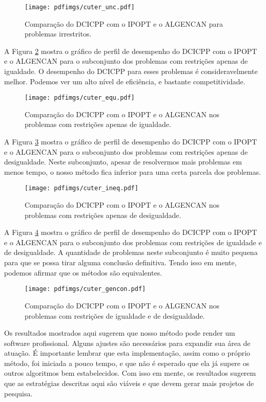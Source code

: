 \begin{figure}[!ht]
\centering
\texttt{[image: pdfimgs/cuter\_unc.pdf]}
\caption{ Comparação do DCICPP com o IPOPT e o ALGENCAN para problemas
irrestritos.}
\label{fig:union_unc_strict}
\end{figure}

A Figura \ref{fig:union_equ_strict} mostra o gráfico de perfil de
desempenho do DCICPP com o IPOPT e o ALGENCAN para o subconjunto dos problemas
com restrições apenas de igualdade. O desempenho do DCICPP para esses problemas é
consideravelmente melhor. Podemos ver um alto nível de eficiência, e bastante
competitividade.

\begin{figure}[!ht]
\centering
\texttt{[image: pdfimgs/cuter\_equ.pdf]}
\caption{ Comparação do DCICPP com o IPOPT e o ALGENCAN nos problemas com
restrições apenas de igualdade.}
\label{fig:union_equ_strict}
\end{figure}

A Figura \ref{fig:union_ineq_strict} mostra o gráfico de perfil de
desempenho do DCICPP com o IPOPT e o ALGENCAN para o subconjunto dos problemas
com restrições apenas de desigualdade. Neste subconjunto, apesar de resolvermos
mais problemas em menos tempo, o nosso método fica inferior para uma certa
parcela dos problemas. 

\begin{figure}[!ht]
\centering
\texttt{[image: pdfimgs/cuter\_ineq.pdf]}
\caption{ Comparação do DCICPP com o IPOPT e o ALGENCAN nos problemas com
restrições apenas de desigualdade.}
\label{fig:union_ineq_strict}
\end{figure}

A Figura \ref{fig:union_gencon_strict} mostra o gráfico de perfil de
desempenho do DCICPP com o IPOPT e o ALGENCAN para o subconjunto dos problemas
com restrições de igualdade e de desigualdade. A quantidade de problemas neste
subconjunto é muito pequena para que se possa tirar alguma conclusão definitiva.
Tendo isso em mente, podemos afirmar que os métodos são equivalentes.

\begin{figure}[!ht]
\centering
\texttt{[image: pdfimgs/cuter\_gencon.pdf]}
\caption{ Comparação do DCICPP com o IPOPT e o ALGENCAN nos problemas com
  restrições de igualdade e de desigualdade.}
\label{fig:union_gencon_strict}
\end{figure}

Os resultados mostrados aqui sugerem que nosso método pode render um software
profissional. Alguns ajustes são necessários para expandir sua área de
atuação.
É importante lembrar que esta implementação, assim como o próprio método, foi
iniciada a pouco tempo, e que não é esperado que ela já supere os outros algoritmos
bem estabelecidos.
Com isso em mente, os resultados sugerem que as estratégias descritas aqui são
viáveis e que devem gerar mais projetos de pesquisa.
